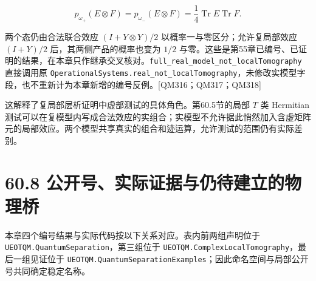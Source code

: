 \documentclass[
  11pt,
  oneside]{book}
\begin{document}
\[
p_{\omega_+}(E\otimes F)
=p_{\omega_-}(E\otimes F)
=\frac14\operatorname{Tr}E\operatorname{Tr}F.
\]

两个态仍由合法联合效应 \((I+Y\otimes Y)/2\)
以概率一与零区分；允许复局部效应 \((I+Y)/2\) 后，其两侧产品的概率也变为
\(1/2\)
与零。这些是第55章已编号、已证明的结果，在本章只作继承交叉核对。\texttt{full\_\allowbreak real\_\allowbreak model\_\allowbreak not\_\allowbreak localTomography}
直接调用原
\texttt{OperationalSystems.real\_\allowbreak not\_\allowbreak localTomography}，未修改实模型字段，也不重新计为本章新增的编号反例。{[}QM316；QM317；QM318{]}

这解释了复局部层析证明中虚部测试的具体角色。第60.5节的局部 \(T\) 类
Hermitian
测试可以在复模型内写成合法效应的实组合；实模型不允许据此悄然加入含虚矩阵元的局部效应。两个模型共享真实的组合和迹运算，允许测试的范围仍有实际差别。

\hypertarget{ux516cux5f00ux53f7ux5b9eux9645ux8bc1ux636eux4e0eux4ecdux5f85ux5efaux7acbux7684ux7269ux7406ux6865}{%
\section{60.8
公开号、实际证据与仍待建立的物理桥}\label{ux516cux5f00ux53f7ux5b9eux9645ux8bc1ux636eux4e0eux4ecdux5f85ux5efaux7acbux7684ux7269ux7406ux6865}}

本章四个编号结果与实际代码按以下关系对应。表内前两组声明位于
\texttt{UEOTQM.QuantumSeparation}，第三组位于
\texttt{UEOTQM.ComplexLocalTomography}，最后一组见证位于
\texttt{UEOTQM.QuantumSeparationExamples}；因此命名空间与局部公开号共同确定稳定名称。
\end{document}
